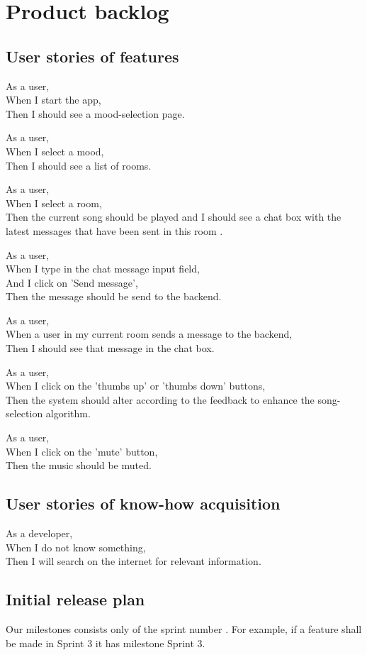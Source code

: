 \chapter{Product backlog}

\section{User stories of features}
As a user,\\
When I start the app,\\
Then I should see a mood-selection page.

As a user,\\
When I select a mood,\\
Then I should see a list of rooms.

As a user,\\
When I select a room,\\
Then the current song should be played and I should see a chat box with the latest messages that have been sent in this room .

As a user,\\
When I type in the chat message input field,\\
And I click on 'Send message',\\
Then the message should be send to the backend.

As a user,\\
When a user in my current room sends a message to the backend,\\
Then I should see that message in the chat box.

As a user,\\
When I click on the 'thumbs up' or 'thumbs down' buttons,\\
Then the system should alter according to the feedback to enhance the song-selection algorithm.

As a user,\\
When I click on the 'mute' button,\\
Then the music should be muted.

\section{User stories of know-how acquisition}
As a developer, \\
When I do not know something, \\
Then I will search on the internet for relevant information.

\section{Initial release plan}
Our milestones consists only of the sprint number .
For example, if a feature shall be made in Sprint 3 it has milestone Sprint 3. 

